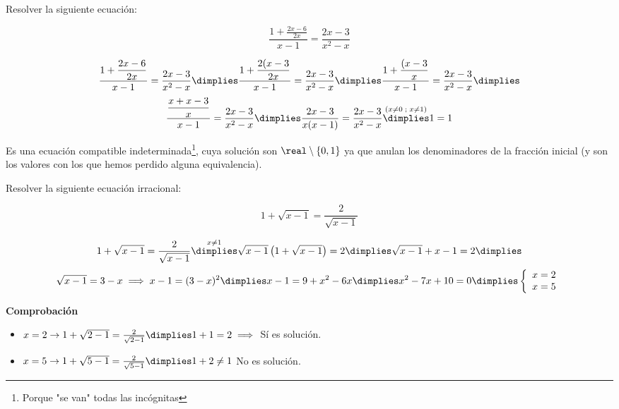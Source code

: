 \documentclass[palatino,nosec,nochap]{Docencia}
\begin{document}
\newpage
\begin{problem}

Resolver la siguiente ecuación: 

\[
	\frac{1+\displaystyle\frac{2x-6}{2x}}{x-1} = \frac{2x-3}{x^2-x}
\]

\solution

\[
	\frac{1+\displaystyle\frac{2x-6}{2x}}{x-1} = \frac{2x-3}{x^2-x} 
	\dimplies 
	\frac{1+\displaystyle\frac{2(x-3}{2x}}{x-1} = \frac{2x-3}{x^2-x} 
	\dimplies
	\frac{1+\displaystyle\frac{(x-3}{x}}{x-1} = \frac{2x-3}{x^2-x} 
	\dimplies
	\]\[
	\frac{\displaystyle\frac{x+x-3}{x}}{x-1} = \frac{2x-3}{x^2-x} 
	{\dimplies}
	\frac{2x-3}{x(x-1)} = \frac{2x-3}{x^2-x} 
	\overset{(x\neq0\;;\;x\neq1)}{\dimplies}
	1=1
\]

Es una ecuación compatible indeterminada\footnote{Porque "se van" todas las incógnitas}, cuya solución son $\real\setminus\{0,1\}$ ya que anulan los denominadores de la fracción inicial (y son los valores con los que hemos perdido alguna equivalencia).

\end{problem}

\begin{problem}

Resolver la siguiente ecuación irracional:

\[
	1+\sqrt{x-1} = \frac{2}{\sqrt{x-1}}
\]

\solution


\[
	1+\sqrt{x-1} = \frac{2}{\sqrt{x-1}} \overset{x\neq1}{\dimplies} \sqrt{x-1}\left(1+\sqrt{x-1}\right) = 2 \dimplies \sqrt{x-1}+x-1=2\dimplies	\]
	\[ \sqrt{x-1} = 3-x \implies x-1 = (3-x)^2 
	\dimplies x-1 = 9+x^2-6x \dimplies x^2-7x+10 = 0 \dimplies \left\{\begin{array}{c}
	x=2\\
	x=5
	\end{array}\right.
\]

\textbf{Comprobación}
\begin{itemize}
	\item $x=2 \to 1+\sqrt{2-1} = \frac{2}{\sqrt{2-1}} \dimplies 1+1=2 \implies $ Sí es solución.
	\item $x=5 \to 1+\sqrt{5-1} = \frac{2}{\sqrt{5-1}} \dimplies 1+2\neq1$ No es solución.
\end{itemize}

\end{problem}


\newpage
\end{document}
